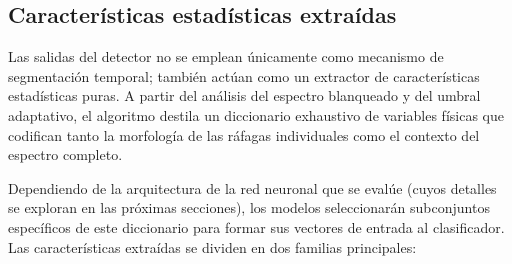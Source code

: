 \begin{table}[htbp]
\caption{Firma espectral característica de los emisores coexistentes en la banda \gls{ism} de 2.4\,GHz, para $N_w = 2048$ y $\beta = 4.0$.}
\label{tab:bins_activos_protocolo}
\vspace{0.1cm}
\centering
\small
{}
\end{table}

\subsection{Características estadísticas extraídas}
\label{subsec:features_fisicas}

Las salidas del detector no se emplean únicamente como mecanismo de segmentación temporal; también actúan como un extractor de características estadísticas puras. A partir del análisis del espectro blanqueado y del umbral adaptativo, el algoritmo destila un diccionario exhaustivo de variables físicas que codifican tanto la morfología de las ráfagas individuales como el contexto del espectro completo.

Dependiendo de la arquitectura de la red neuronal que se evalúe (cuyos detalles se exploran en las próximas secciones), los modelos seleccionarán subconjuntos específicos de este diccionario para formar sus vectores de entrada al clasificador. Las características extraídas se dividen en dos familias principales:

